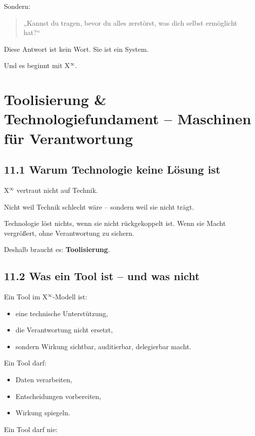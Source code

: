 \documentclass[12pt,a4paper]{book}
\begin{document}
Sondern:

\begin{quote}
„Kannst du tragen,  
bevor du alles zerstörst,  
was dich selbst ermöglicht hat?“  
\end{quote}

Diese Antwort ist kein Wort.  
Sie ist ein System.

Und es beginnt mit X$^\infty$.

\chapter{Toolisierung \& Technologiefundament – Maschinen für Verantwortung}

\section*{11.1 Warum Technologie keine Lösung ist}

X$^\infty$ vertraut nicht auf Technik.

Nicht weil Technik schlecht wäre –  
sondern weil sie nicht trägt.

Technologie löst nichts,  
wenn sie nicht rückgekoppelt ist.  
Wenn sie Macht vergrößert, ohne Verantwortung zu sichern.

Deshalb braucht es: \textbf{Toolisierung}.

\section*{11.2 Was ein Tool ist – und was nicht}

Ein Tool im X$^\infty$-Modell ist:

\begin{itemize}
    \item eine technische Unterstützung,
    \item die Verantwortung nicht ersetzt,
    \item sondern Wirkung sichtbar, auditierbar, delegierbar macht.
\end{itemize}

Ein Tool darf:

\begin{itemize}
    \item Daten verarbeiten,
    \item Entscheidungen vorbereiten,
    \item Wirkung spiegeln.
\end{itemize}

Ein Tool darf nie:
\end{document}
